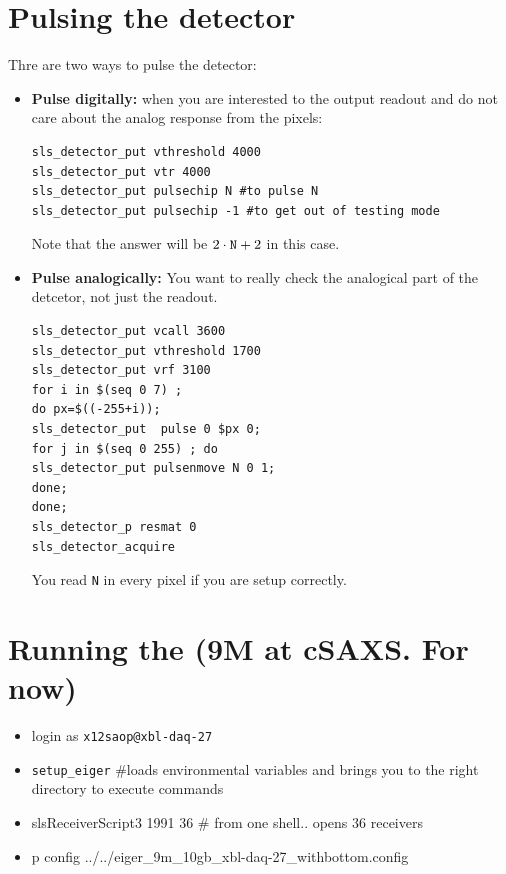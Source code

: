 \documentclass{article}
\begin{document}
\section{Pulsing the detector}
Thre are two ways to pulse the detector: 
\begin{itemize}
\item \textbf{Pulse digitally:} when you are interested to the output readout and do not care about the analog response from the pixels:
 \begin{verbatim}
sls_detector_put vthreshold 4000
sls_detector_put vtr 4000
sls_detector_put pulsechip N #to pulse N
sls_detector_put pulsechip -1 #to get out of testing mode 
\end{verbatim}
Note that the answer will be $2 \cdot \textrm{{\tt{N}}} +2$ in this case.

\item  \textbf{Pulse analogically:} You want to really check the analogical part of the detcetor, not just the readout.

 \begin{verbatim}
sls_detector_put vcall 3600
sls_detector_put vthreshold 1700
sls_detector_put vrf 3100
for i in $(seq 0 7) ; 
do px=$((-255+i)); 
sls_detector_put  pulse 0 $px 0;
for j in $(seq 0 255) ; do
sls_detector_put pulsenmove N 0 1;
done;
done;
sls_detector_p resmat 0
sls_detector_acquire
\end{verbatim}
You read {\tt{N}} in every pixel if you are setup correctly. 
\end{itemize}
 

\section{Running the (9M at cSAXS. For now)}
\begin{itemize}
\item login as {\tt{x12saop@xbl-daq-27}}
\item {\tt{setup\_eiger}} \#loads environmental variables and brings you to the right directory to execute commands
\item slsReceiverScript3 1991 36 \# from one shell.. opens 36 receivers
\item p config ../../eiger\_9m\_10gb\_xbl-daq-27\_withbottom.config
\end{itemize}
\end{document}
